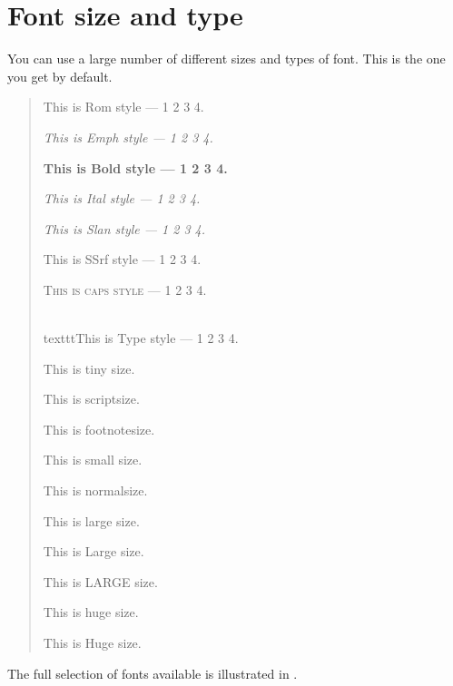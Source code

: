 \documentclass[twoside,11pt]{starlink}
\begin{document}
\newpage

\section{Font size and type}

\begin{small}
\begin{terminalv}
You can use a large number of different sizes and types of font.
This is the one you get by default.

\vspace{10mm}

\begin{quote}

\textrm{This is Rom style --- 1 2 3 4.}

\emph{This is Emph style --- 1 2 3 4.}

\textbf{This is Bold style --- 1 2 3 4.}

\textit{This is Ital style --- 1 2 3 4.}

\textsl{This is Slan style --- 1 2 3 4.}

\textsf{This is SSrf style --- 1 2 3 4.}

\textsc{This is caps style --- 1 2 3 4.}

\\texttt{This is Type style --- 1 2 3 4.}

{\tiny This is tiny size.}

{\scriptsize This is scriptsize.}

{\footnotesize This is footnotesize.}

{\small This is small size.}

{\normalsize This is normalsize.}

{\large This is large size.}

{\Large This is Large size.}

{\LARGE This is LARGE size.}

{\huge This is huge size.}

{\Huge This is Huge size.}

\end{quote}

\vspace{10mm}

The full selection of fonts available is illustrated in .
\end{terminalv}
\end{small}

\newpage
\end{document}
